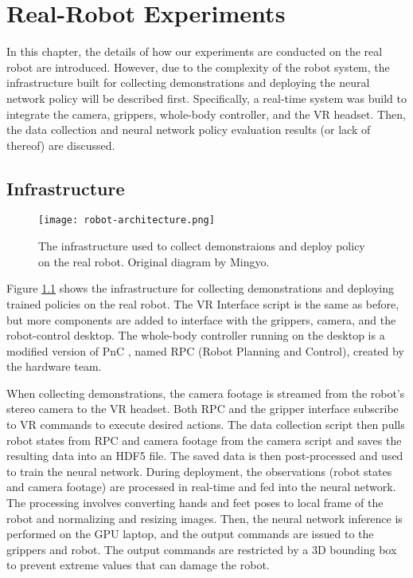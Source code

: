 \chapter{Real-Robot Experiments}

In this chapter, the details of how our experiments are conducted on the real robot are introduced. 
However, due to the complexity of the robot system, the infrastructure built for collecting demonstrations and deploying the neural network policy will be described first. Specifically, a real-time system was build to integrate the camera, grippers, whole-body controller, and the VR headset. Then, the data collection and neural network policy evaluation results (or lack of thereof) are discussed. 

\section{Infrastructure}

\begin{figure}
	\centering
	\texttt{[image: robot-architecture.png]}
    \caption{The infrastructure used to collect demonstraions and deploy policy on the real robot. Original diagram by Mingyo.}
    \label{fig:robot-architecture}
\end{figure}

Figure \ref{fig:robot-architecture} shows the infrastructure for collecting demonstrations and deploying trained policies on the real robot. 
The VR Interface script is the same as before, but more components are added to interface with the grippers, camera, and the robot-control desktop. The whole-body controller running on the desktop is a modified version of PnC \cite{Ahn2021VersatileLP}, named RPC (Robot Planning and Control), created by the hardware team. 

When collecting demonstrations, the camera footage is streamed from the robot's stereo camera to the VR headset. Both RPC and the gripper interface subscribe to VR commands to execute desired actions. The data collection script then pulls robot states from RPC and camera footage from the camera script and saves the resulting data into an HDF5 file. The saved data is then post-processed and used to train the neural network. 
During deployment, the observations (robot states and camera footage) are processed in real-time and fed into the neural network. The processing involves converting hands and feet poses to local frame of the robot and normalizing and resizing images. Then, the neural network inference is performed on the GPU laptop, and the output commands are issued to the grippers and robot. The output commands are restricted by a 3D bounding box to prevent extreme values that can damage the robot. 

